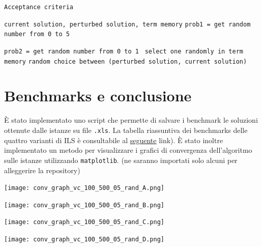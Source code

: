 \documentclass[11pt]{article}
\begin{document}
\begin{algorithm}
\caption{\texttt{Acceptance criteria}}
\begin{algorithmic}
    \Require \texttt{current solution, perturbed solution, term memory}
    \State \texttt{prob1 = get random number from 0 to 5}

            \State \texttt{prob2 = get random number from 0 to 1}
                \Return \texttt{ select one randomly in term memory}
            \EndIf
        \EndIf
    \EndIf
    \State \Return \texttt{random choice between (perturbed solution, current solution)}
\end{algorithmic}
\end{algorithm}

\pagebreak

\section{Benchmarks e conclusione}

È stato implementato uno script che permette di salvare i benchmark le soluzioni ottenute dalle istanze su  file \verb|.xls|.
La tabella riassuntiva dei benchmarks delle quattro varianti di ILS è consultabile al \href{https://github.com/khalld/mwvc-using-ils/tree/main/benchmarks}{seguente} link). È stato inoltre implementato un metodo per visualizzare i grafici di convergenza dell'algoritmo sulle istanze utilizzando \verb|matplotlib|. (ne saranno importati solo alcuni per alleggerire la repository)

\begin{center}
\begin{minipage}{0.48\linewidth}
\texttt{[image: conv\_graph\_vc\_100\_500\_05\_rand\_A.png]}
\end{minipage}%
\begin{minipage}{0.49\linewidth}
\texttt{[image: conv\_graph\_vc\_100\_500\_05\_rand\_B.png]}
\end{minipage}
\begin{minipage}{0.49\linewidth}
\texttt{[image: conv\_graph\_vc\_100\_500\_05\_rand\_C.png]}
\end{minipage}
\begin{minipage}{0.49\linewidth}
\texttt{[image: conv\_graph\_vc\_100\_500\_05\_rand\_D.png]}
\end{minipage}
\end{center}
\end{document}
